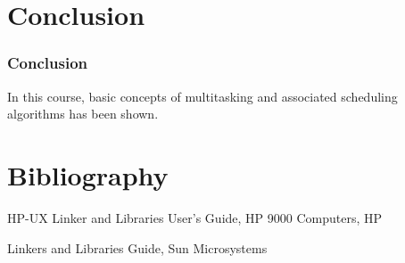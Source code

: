 %
%

\section{Conclusion}


\begin{frame}
  \frametitle{Conclusion}

  In this course, basic concepts of multitasking and associated scheduling algorithms has been shown.

 

\end{frame}



%
%

\section{Bibliography}

\begin{thebibliography}{3}
HP-UX Linker and Libraries User's Guide, HP 9000 Computers, HP

Linkers and Libraries Guide, Sun Microsystems

\end{thebibliography}



